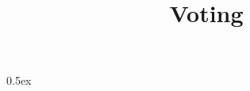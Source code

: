 \documentclass[11pt,a4paper]{article}
\begin{document}
\title{Voting}
\author{}
\maketitle

\tableofcontents

\parindent 0pt\parskip 0.5ex



%
%
\end{document}
